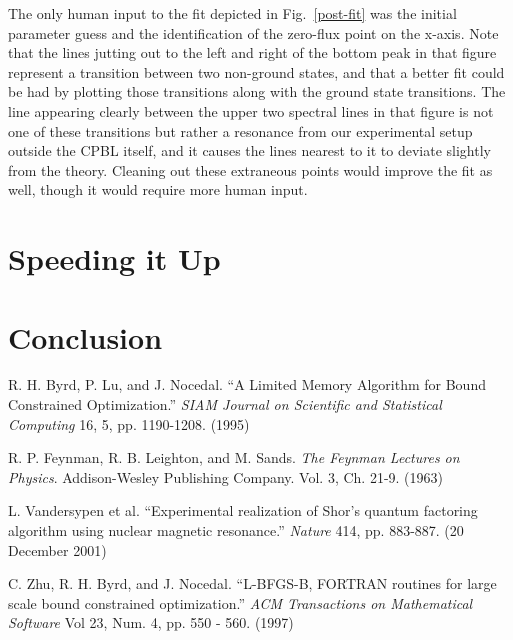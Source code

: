 \documentclass[twocolumn]{revtex4}
\begin{document}
The only human input to the fit depicted in Fig.~\ref{post-fit} was
the initial parameter guess and the identification of the zero-flux
point on the x-axis. Note that the lines jutting out to the left and
right of the bottom peak in that figure represent a transition between
two non-ground states, and that a better fit could be had by plotting
those transitions along with the ground state transitions. The line
appearing clearly between the upper two spectral lines in that figure
is not one of these transitions but rather a resonance from our
experimental setup outside the CPBL itself, and it causes the lines
nearest to it to deviate slightly from the theory. Cleaning out these
extraneous points would improve the fit as well, though it would
require more human input.

\section{Speeding it Up}



\section{Conclusion}



\begin{thebibliography}{9}
 R. H. Byrd, P. Lu, and J. Nocedal. ``A Limited Memory
  Algorithm for Bound Constrained Optimization.'' \textit{SIAM Journal
    on Scientific and Statistical Computing} 16, 5,
  pp. 1190-1208. (1995)
  
 R. P. Feynman, R. B. Leighton, and
  M. Sands. \textit{The Feynman Lectures on Physics}. Addison-Wesley
  Publishing Company. Vol. 3, Ch. 21-9. (1963)

 L. Vandersypen et al. ``Experimental realization
  of Shor's quantum factoring algorithm using nuclear magnetic
  resonance.'' \textit{Nature} 414, pp. 883-887. (20 December 2001)
  
 C. Zhu, R. H. Byrd, and J. Nocedal. ``L-BFGS-B, FORTRAN
  routines for large scale bound constrained optimization.''
  \textit{ACM Transactions on Mathematical Software} Vol 23, Num. 4,
  pp. 550 - 560. (1997)

\end{thebibliography}
\end{document}
